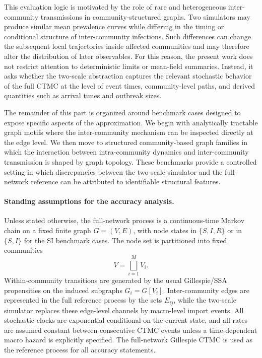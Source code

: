 \documentclass{article}
\begin{document}
This evaluation logic is motivated by the role of rare and heterogeneous inter-community transmissions in community-structured graphs. Two simulators may produce similar mean prevalence curves while differing in the timing or conditional structure of inter-community infections. Such differences can change the subsequent local trajectories inside affected communities and may therefore alter the distribution of later observables. For this reason, the present work does not restrict attention to deterministic limits or mean-field summaries. Instead, it asks whether the two-scale abstraction captures the relevant stochastic behavior of the full CTMC at the level of event times, community-level paths, and derived quantities such as arrival times and outbreak sizes.

The remainder of this part is organized around benchmark cases designed to expose specific aspects of the approximation. We begin with analytically tractable graph motifs where the inter-community mechanism can be inspected directly at the edge level. We then move to structured community-based graph families in which the interaction between intra-community dynamics and inter-community transmission is shaped by graph topology. These benchmarks provide a controlled setting in which discrepancies between the two-scale simulator and the full-network reference can be attributed to identifiable structural features.

\paragraph{Standing assumptions for the accuracy analysis.}
Unless stated otherwise, the full-network process is a continuous-time Markov chain on a fixed finite graph \(G=(V,E)\), with node states in \(\{S,I,R\}\) or in \(\{S,I\}\) for the SI benchmark cases. 
The node set is partitioned into fixed communities
\[
V=\bigsqcup_{i=1}^{M}V_i.
\]
Within-community transitions are generated by the usual Gillespie/SSA propensities on the induced subgraphs \(G_i=G[V_i]\). 
Inter-community edges are represented in the full reference process by the sets \(E_{ij}\), while the two-scale simulator replaces these edge-level channels by macro-level import events. 
All stochastic clocks are exponential conditional on the current state, and all rates are assumed constant between consecutive CTMC events unless a time-dependent macro hazard is explicitly specified. 
The full-network Gillespie CTMC is used as the reference process for all accuracy statements.
\end{document}
